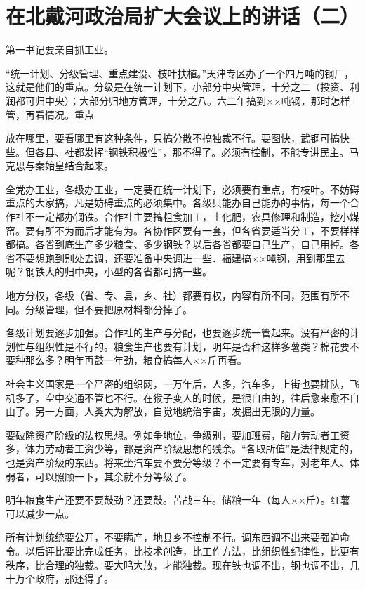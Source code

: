 \section[在北戴河政治局扩大会议上的讲话（二）（一九五八年八月十九日）]{在北戴河政治局扩大会议上的讲话（二）}


第一书记要亲自抓工业。

“统一计划、分级管理、重点建设、枝叶扶植。”天津专区办了一个四万吨的钢厂，这就是他们的重点。分级是在统一计划下，小部分中央管理，十分之二（投资、利润都可归中央）；大部分归地方管理，十分之八。六二年搞到××吨钢，那时怎样管，再看情况。重点

放在哪里，要看哪里有这种条件，只搞分散不搞独裁不行。要图快，武钢可搞快些。但各县、社都发挥“钢铁积极性”，那不得了。必须有控制，不能专讲民主。马克思与秦始皇结合起来。

全党办工业，各级办工业，一定要在统一计划下，必须要有重点，有枝叶。不妨碍重点的大家搞，凡是妨碍重点的必须集中。各级只能办自己能办的事情，每一个合作社不一定都办钢铁。合作社主要搞粗食加工，土化肥，农具修理和制造，挖小煤窑。要有所不为而后才能有为。各协作区要有一套，但各省要适当分工，不要样样都搞。各省到底生产多少粮食、多少钢铁？以后各省都要自己生产，自己用掉。各省不要想跑到别处去调，还要准备中央调进一些．福建搞××吨钢，用到那里去呢？钢铁大的归中央，小型的各省都可搞一些。

地方分权，各级（省、专、县，乡、社）都要有权，内容有所不同，范围有所不同。分级管理，但不要把原材料都分掉了。

各级计划要逐步加强。合作社的生产与分配，也要逐步统一管起来。没有严密的计划性与组织性是不行的。粮食生产也要有计划，明年是否种这样多薯类？棉花要不要种那么多？明年再鼓一年劲，粮食搞每人××斤再看。

社会主义国家是一个严密的组织网，一万年后，人多，汽车多，上街也要排队，飞机多了，空中交通不管也不行。在猴子变人的时候，是很自由的，往后愈来愈不自由了。另一方面，人类大为解放，自觉地统治宇宙，发掘出无限的力量。

要破除资产阶级的法权思想。例如争地位，争级别，要加班费，脑力劳动者工资多，体力劳动者工资少等，都是资产阶级思想的残余。“各取所值”是法律规定的，也是资产阶级的东西。将来坐汽车要不要分等级？不一定要有专车，对老年人、体弱者，可以照顾一下，其余就不分等级了。

明年粮食生产还要不要鼓劲？还要鼓。苦战三年。储粮一年（每人××斤）。红薯可以减少一点。

所有计划统统要公开，不要瞒产，地县乡不控制不行。调东西调不出来要强迫命令。以后评比要比完成任务，比技术创造，比工作方法，比组织性纪律性，比更有秩序，比合理的独裁。要大鸣大放，才能独裁。现在铁也调不出，钢也调不出，几十万个政府，那还得了。

